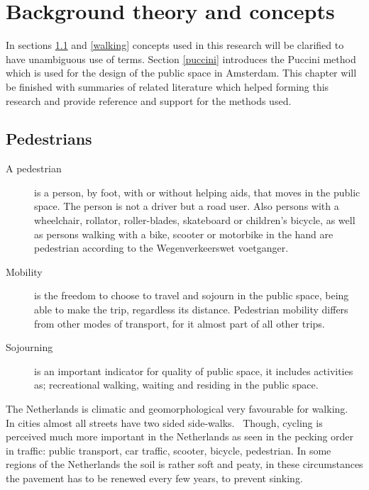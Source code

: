 \chapter[Background theory and concepts]{Background theory and concepts}
In sections \ref{pedestrians} and \ref{walking} concepts used in this research will be clarified to have unambiguous use of terms. Section \ref{puccini} introduces the Puccini method which is used for the design of the public space in Amsterdam. 
This chapter will be finished with summaries of related literature which helped forming this research and provide reference and support for the methods used.

\section[Pedestrians]{Pedestrians}\label{pedestrians}
\begin{description}\item[A pedestrian] is a person, by foot, with or without helping aids, that moves in the public space. The person is not a driver but a road user. Also persons with a wheelchair, rollator, roller-blades, skateboard or children's bicycle, as well as persons walking with a bike, scooter or motorbike in the hand are pedestrian according to the Wegenverkeerswet voetganger.~\cite{Crow2014}
\item[Mobility] is the freedom to choose to travel and sojourn in the public space, being able to make the trip, regardless its distance. Pedestrian mobility differs from other modes of transport, for it almost part of all other trips.~\cite{Sauter2010}
\item[Sojourning] is an important indicator for quality of public space, it includes activities as; recreational walking, waiting and residing in the public space.~\cite{Sauter2010} \end{description}

The Netherlands is climatic and geomorphological very favourable for walking.~\cite{Sauter2010} In cities almost all streets have two sided side-walks.~\cite{Sauter2010} Though, cycling is perceived much more important in the Netherlands as seen in the pecking order in traffic: public transport, car traffic, scooter, bicycle, pedestrian. In some regions of the Netherlands the soil is rather soft and peaty, in these circumstances the pavement has to be renewed every few years, to prevent sinking.
	
